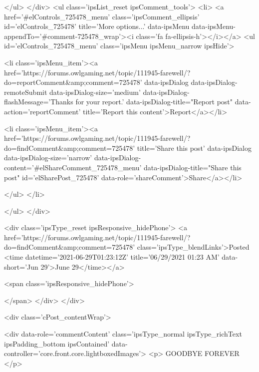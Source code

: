 					
					
					
					
				</ul>
			</div>
			<ul class='ipsList_reset ipsComment_tools'>
				<li>
					<a href='#elControls_725478_menu' class='ipsComment_ellipsis' id='elControls_725478' title='More options...' data-ipsMenu data-ipsMenu-appendTo='#comment-725478_wrap'><i class='fa fa-ellipsis-h'></i></a>
					<ul id='elControls_725478_menu' class='ipsMenu ipsMenu_narrow ipsHide'>
						
							<li class='ipsMenu_item'><a href='https://forums.owlgaming.net/topic/111945-farewell/?do=reportComment&amp;comment=725478' data-ipsDialog data-ipsDialog-remoteSubmit data-ipsDialog-size='medium' data-ipsDialog-flashMessage='Thanks for your report.' data-ipsDialog-title="Report post" data-action='reportComment' title='Report this content'>Report</a></li>
						
						
							<li class='ipsMenu_item'><a href='https://forums.owlgaming.net/topic/111945-farewell/?do=findComment&amp;comment=725478' title='Share this post' data-ipsDialog data-ipsDialog-size='narrow' data-ipsDialog-content='#elShareComment_725478_menu' data-ipsDialog-title="Share this post" id='elSharePost_725478' data-role='shareComment'>Share</a></li>
						
                        
						
						
						
							
								
							
							
							
							
							
							
						
					</ul>
				</li>
				
			</ul>
		</div>

		<div class='ipsType_reset ipsResponsive_hidePhone'>
			<a href='https://forums.owlgaming.net/topic/111945-farewell/?do=findComment&amp;comment=725478' class='ipsType_blendLinks'>Posted <time datetime='2021-06-29T01:23:12Z' title='06/29/2021 01:23  AM' data-short='Jun 29'>June 29</time></a> 
			
			<span class='ipsResponsive_hidePhone'>
				
				
			</span>
		</div>
	</div>

	

    

	<div class='cPost_contentWrap'>
		
		<div data-role='commentContent' class='ipsType_normal ipsType_richText ipsPadding_bottom ipsContained' data-controller='core.front.core.lightboxedImages'>
			<p>
	GOODBYE FOREVER
</p>


